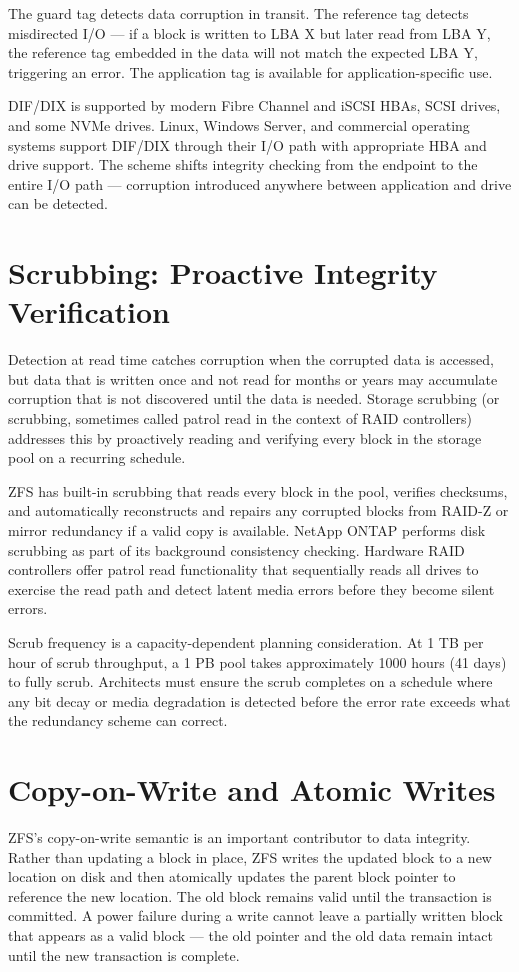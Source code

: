 The guard tag detects data corruption in transit. The reference tag detects misdirected I/O --- if a block is written to LBA X but later read from LBA Y, the reference tag embedded in the data will not match the expected LBA Y, triggering an error. The application tag is available for application-specific use.

DIF/DIX is supported by modern Fibre Channel and iSCSI HBAs, SCSI drives, and some NVMe drives. Linux, Windows Server, and commercial operating systems support DIF/DIX through their I/O path with appropriate HBA and drive support. The scheme shifts integrity checking from the endpoint to the entire I/O path --- corruption introduced anywhere between application and drive can be detected.

\section{Scrubbing: Proactive Integrity Verification}
Detection at read time catches corruption when the corrupted data is accessed, but data that is written once and not read for months or years may accumulate corruption that is not discovered until the data is needed. Storage scrubbing (or scrubbing, sometimes called patrol read in the context of RAID controllers) addresses this by proactively reading and verifying every block in the storage pool on a recurring schedule.

ZFS has built-in scrubbing that reads every block in the pool, verifies checksums, and automatically reconstructs and repairs any corrupted blocks from RAID-Z or mirror redundancy if a valid copy is available. NetApp ONTAP performs disk scrubbing as part of its background consistency checking. Hardware RAID controllers offer patrol read functionality that sequentially reads all drives to exercise the read path and detect latent media errors before they become silent errors.

Scrub frequency is a capacity-dependent planning consideration. At 1 TB per hour of scrub throughput, a 1 PB pool takes approximately 1000 hours (41 days) to fully scrub. Architects must ensure the scrub completes on a schedule where any bit decay or media degradation is detected before the error rate exceeds what the redundancy scheme can correct.

\section{Copy-on-Write and Atomic Writes}
ZFS's copy-on-write semantic is an important contributor to data integrity. Rather than updating a block in place, ZFS writes the updated block to a new location on disk and then atomically updates the parent block pointer to reference the new location. The old block remains valid until the transaction is committed. A power failure during a write cannot leave a partially written block that appears as a valid block --- the old pointer and the old data remain intact until the new transaction is complete.

